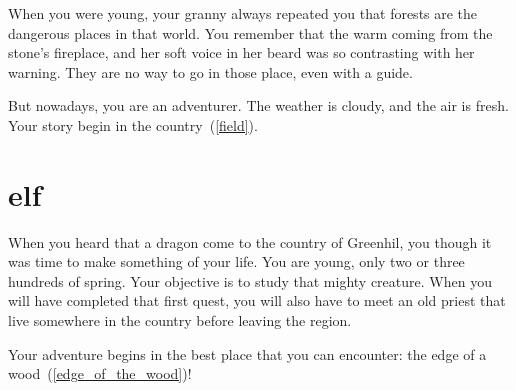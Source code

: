 When you were young, your granny always repeated you that forests are the
dangerous places in that world. You remember that the warm coming from the
stone's fireplace, and her soft voice in her beard was so contrasting with her
warning. They are no way to go in those place, even with a guide.

But nowadays, you are an adventurer. The weather is cloudy, and the air is
fresh. Your story begin in the country~(\ref{field}).

\section{elf}

When you heard that a dragon come to the country of Greenhil, you though it was
time to make something of your life. You are young, only two or three hundreds
of spring. Your objective is to study that mighty creature. When you will have
completed that first quest, you will also have to meet an old priest that live
somewhere in the country before leaving the region.

Your adventure begins in the best place that you can encounter: the edge of a
wood~(\ref{edge_of_the_wood})!
